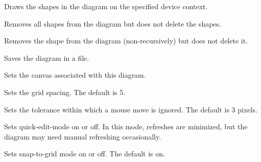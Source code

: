 
Draws the shapes in the diagram on the specified device context.



Removes all shapes from the diagram but does not delete the shapes.



Removes the shape from the diagram (non-recursively) but does not delete it.



Saves the diagram in a file.

\label{wxdiagramsetcanvas}


Sets the canvas associated with this diagram.



Sets the grid spacing. The default is 5.



Sets the tolerance within which a mouse move is ignored. The default is 3 pixels.



Sets quick-edit-mode on or off. In this mode, refreshes are minimized, but the
diagram may need manual refreshing occasionally.



Sets snap-to-grid mode on or off. The default is on.



